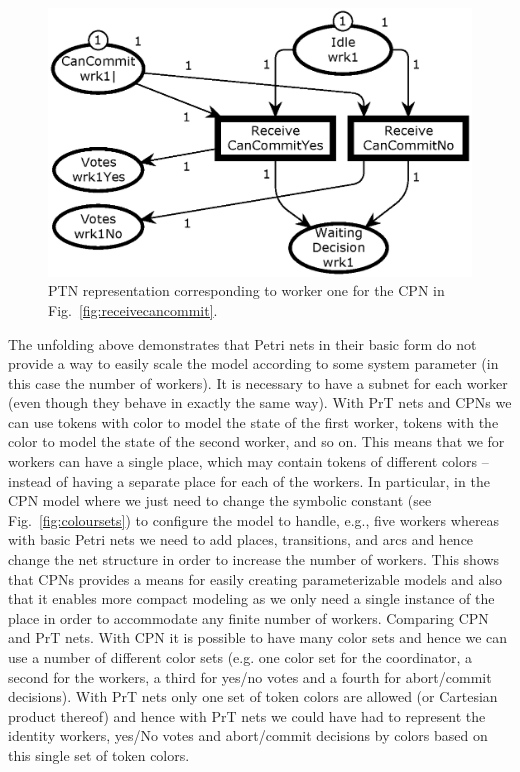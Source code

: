 \begin{figure}[t]
\centering
\includegraphics[scale=.45]{figures/PTReceiveCanCommit.eps}
\caption{PTN representation corresponding to worker one for the CPN in Fig.~\ref{fig:receivecancommit}.}
\label{fig:receivecancommitunfold}
\end{figure}


The unfolding above demonstrates that Petri nets in their basic form
do not provide a way to easily scale the model according to some
system parameter (in this case the number of workers). It is necessary
to have a subnet for each worker (even though they behave in exactly
the same way). With PrT nets and CPNs we can use tokens with color
 to model the state of the first worker, tokens with
the color  to model the state of the second worker,
and so on. This means that we for  workers can have a
single  place, which may contain tokens of 
different colors -- instead of having a separate  place
for each of the  workers. In particular, in the CPN model
where we just need to change the symbolic constant  (see
Fig.~\ref{fig:coloursets}) to configure the model to handle, e.g.,
five workers whereas with basic Petri nets we need to add places,
transitions, and arcs and hence change the net structure in order to
increase the number of workers.  This shows that CPNs provides a means
for easily creating parameterizable models and also that it enables
more compact modeling as we only need a single instance of the
 place in order to accommodate any finite number of
workers. Comparing CPN and PrT nets. With CPN it is possible to have
many color sets and hence we can use a number of different color sets
(e.g. one color set for the coordinator, a second for the workers, a
third for yes/no votes and a fourth for abort/commit decisions). With
PrT nets only one set of token colors are allowed (or Cartesian
product thereof) and hence with PrT nets we could have had to
represent the identity workers, yes/No votes and abort/commit
decisions by colors based on this single set of token colors.
